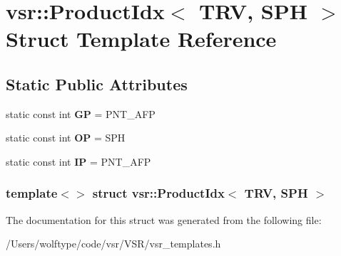 \hypertarget{structvsr_1_1_product_idx_3_01_t_r_v_00_01_s_p_h_01_4}{\section{vsr\-:\-:Product\-Idx$<$ T\-R\-V, S\-P\-H $>$ Struct Template Reference}
\label{structvsr_1_1_product_idx_3_01_t_r_v_00_01_s_p_h_01_4}
}
\subsection*{Static Public Attributes}
\begin{DoxyCompactItemize}
\item 
\hypertarget{structvsr_1_1_product_idx_3_01_t_r_v_00_01_s_p_h_01_4_ae7e09db8eff954c2bf1b22550150b198}{static const int {\bfseries G\-P} = P\-N\-T\-\_\-\-A\-F\-P}\label{structvsr_1_1_product_idx_3_01_t_r_v_00_01_s_p_h_01_4_ae7e09db8eff954c2bf1b22550150b198}

\item 
\hypertarget{structvsr_1_1_product_idx_3_01_t_r_v_00_01_s_p_h_01_4_a193e0b7166c2095fe6e419f81616afb4}{static const int {\bfseries O\-P} = S\-P\-H}\label{structvsr_1_1_product_idx_3_01_t_r_v_00_01_s_p_h_01_4_a193e0b7166c2095fe6e419f81616afb4}

\item 
\hypertarget{structvsr_1_1_product_idx_3_01_t_r_v_00_01_s_p_h_01_4_a1d8055eff30d50240263df8aa77d13bb}{static const int {\bfseries I\-P} = P\-N\-T\-\_\-\-A\-F\-P}\label{structvsr_1_1_product_idx_3_01_t_r_v_00_01_s_p_h_01_4_a1d8055eff30d50240263df8aa77d13bb}

\end{DoxyCompactItemize}
\subsubsection*{template$<$$>$ struct vsr\-::\-Product\-Idx$<$ T\-R\-V, S\-P\-H $>$}



The documentation for this struct was generated from the following file\-:\begin{DoxyCompactItemize}
\item 
/\-Users/wolftype/code/vsr/\-V\-S\-R/vsr\-\_\-templates.\-h\end{DoxyCompactItemize}
